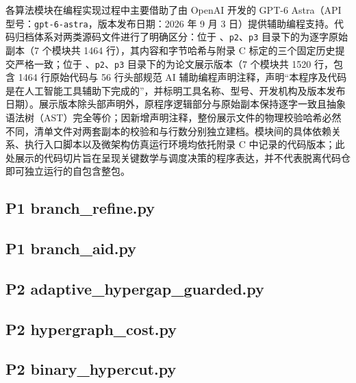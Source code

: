 \documentclass[anonymous,withtoc]{gmcm2026}
\begin{document}
各算法模块在编程实现过程中主要借助了由 OpenAI 开发的 GPT-6 Astra（API 型号：\texttt{gpt-6-astra}，版本发布日期：2026 年 9 月 3 日）提供辅助编程支持。代码归档体系对两类源码文件进行了明确区分：位于 \texttt{}、\texttt{p2}、\texttt{p3} 目录下的为逐字原始副本（7 个模块共 1464 行），其内容和字节哈希与附录 C 标定的三个固定历史提交严格一致；位于 \texttt{}、\texttt{p2}、\texttt{p3} 目录下的为论文展示版本（7 个模块共 1520 行，包含 1464 行原始代码与 56 行头部规范 AI 辅助编程声明注释，声明``本程序及代码是在人工智能工具辅助下完成的''，并标明工具名称、型号、开发机构及版本发布日期）。展示版本除头部声明外，原程序逻辑部分与原始副本保持逐字一致且抽象语法树（AST）完全等价；因新增声明注释，整份展示文件的物理校验哈希必然不同，清单文件对两套副本的校验和与行数分别独立建档。模块间的具体依赖关系、执行入口脚本以及微架构仿真运行环境均依托附录 C 中记录的代码版本；此处展示的代码切片旨在呈现关键数学与调度决策的程序表达，并不代表脱离代码仓即可独立运行的自包含整包。

\FloatBarrier
{}
\subsection{P1 branch\_refine.py}

\subsection{P1 branch\_aid.py}

\subsection{P2 adaptive\_hypergap\_guarded.py}

\subsection{P2 hypergraph\_cost.py}

\subsection{P2 binary\_hypercut.py}

\end{document}
